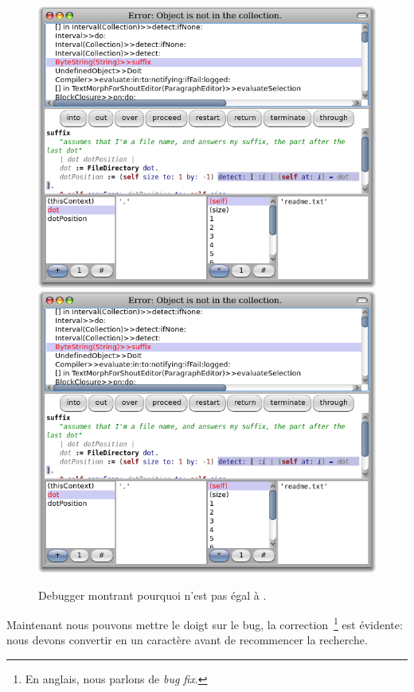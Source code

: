 \documentclass[a4paper,10pt,twoside]{book}
\begin{document}
\begin{figure}[btp]
	\begin{center}
	\ifluluelse
		{\includegraphics[width=\textwidth]{dotIsAString}}
		{\includegraphics[scale=0.7]{dotIsAString}}
	\end{center}
	\caption{Debugger montrant pourquoi  n'est pas \'egal \`a .}
	\label{fig:dotIsAString}
\end{figure}

Maintenant nous pouvons mettre le doigt sur le bug, la correction~\footnote{En anglais, nous parlons de \emph{bug fix}.} est \'evidente: nous devons convertir
 en un caract\`ere avant de recommencer la recherche.
\end{document}

